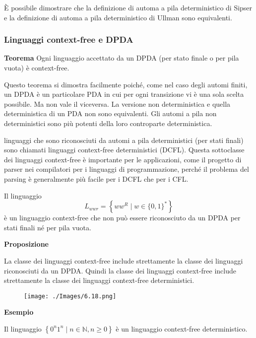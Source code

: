 È possibile dimostrare che la definizione di automa a pila
deterministico di Sipser e la definizione di automa a pila
deterministico di Ullman sono equivalenti.

\subsubsection{Linguaggi context-free e DPDA}

\textbf{Teorema}
Ogni linguaggio accettato da un DPDA (per stato finale o per pila vuota) è context-free.

Questo teorema si dimostra facilmente poiché, come nel caso degli automi finiti, un DPDA è un particolare PDA in cui per ogni transizione vi è una sola scelta possibile.
Ma non vale il viceversa. La versione non deterministica e quella deterministica di un PDA non sono equivalenti. Gli automi a pila non deterministici sono più potenti della loro controparte deterministica.

\vspace{5mm}

linguaggi che sono riconosciuti da automi a pila deterministici
(per stati finali) sono chiamati linguaggi context-free deterministici
(DCFL). Questa sottoclasse dei linguaggi context-free è importante
per le applicazioni, come il progetto di parser nei compilatori per i
linguaggi di programmazione, perché il problema del parsing è
generalmente più facile per i DCFL che per i CFL.

\vspace{5mm}

Il linguaggio
$$
L_{w w r}=\left\{w w^{R} \mid w \in\{0,1\}^{*}\right\}
$$
è un linguaggio context-free che non può essere riconosciuto da un DPDA per stati finali né per pila vuota.

\vspace{5mm}

\textbf{Proposizione}

La classe dei linguaggi context-free include strettamente la classe dei linguaggi riconosciuti da un DPDA. Quindi la classe dei linguaggi context-free include strettamente la classe dei linguaggi context-free deterministici.

\begin{figure}[hbpt!]
    \centering
    \texttt{[image: ./Images/6.18.png]}
\end{figure}
\FloatBarrier

\textbf{Esempio}

Il linguaggio $\left\{0^{n} 1^{n} \mid n \in \mathbb{N}, n \geq 0\right\}$ è un linguaggio context-free deterministico.

